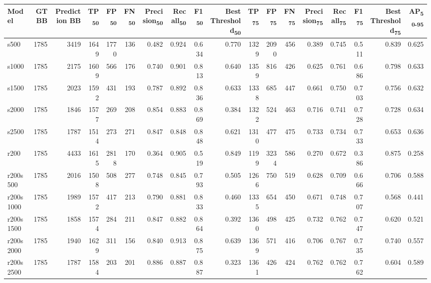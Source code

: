     \begin{table}
    \begin{tabular}{|l|r|r|r|r|r|r|r|r|r|r|r|r|r|r|r|r|r|}
    \hline
    Model & GT BB & Prediction BB & TP\textsubscript{50} & FP\textsubscript{50} & FN\textsubscript{50} & Precision\textsubscript{50} & Recall\textsubscript{50} & F1\textsubscript{50} & Best Threshold\textsubscript{50} & TP\textsubscript{75} & FP\textsubscript{75} & FN\textsubscript{75} & Precision\textsubscript{75} & Recall\textsubscript{75} & F1\textsubscript{75} & Best Threshold\textsubscript{75} & AP\textsubscript{50-95} \\
    \hline
    s500 & 1785 & 3419 & 1649 & 1770 & 136 & 0.482 & 0.924 & 0.634 & 0.770 & 1329 & 2090 & 456 & 0.389 & 0.745 & 0.511 & 0.839 & 0.625 \\
    s1000 & 1785 & 2175 & 1609 & 566 & 176 & 0.740 & 0.901 & 0.813 & 0.640 & 1359 & 816 & 426 & 0.625 & 0.761 & 0.686 & 0.798 & 0.633 \\
    s1500 & 1785 & 2023 & 1592 & 431 & 193 & 0.787 & 0.892 & 0.836 & 0.633 & 1338 & 685 & 447 & 0.661 & 0.750 & 0.703 & 0.756 & 0.632 \\
    s2000 & 1785 & 1846 & 1577 & 269 & 208 & 0.854 & 0.883 & 0.869 & 0.384 & 1322 & 524 & 463 & 0.716 & 0.741 & 0.728 & 0.728 & 0.634 \\
    s2500 & 1785 & 1787 & 1514 & 273 & 271 & 0.847 & 0.848 & 0.848 & 0.621 & 1310 & 477 & 475 & 0.733 & 0.734 & 0.733 & 0.653 & 0.636 \\
    \hline
    r200 & 1785 & 4433 & 1615 & 2818 & 170 & 0.364 & 0.905 & 0.519 & 0.849 & 1199 & 3234 & 586 & 0.270 & 0.672 & 0.386 & 0.875 & 0.258 \\
    r200s500 & 1785 & 2016 & 1508 & 508 & 277 & 0.748 & 0.845 & 0.793 & 0.505 & 1266 & 750 & 519 & 0.628 & 0.709 & 0.666 & 0.706 & 0.588 \\
    r200s1000 & 1785 & 1989 & 1572 & 417 & 213 & 0.790 & 0.881 & 0.833 & 0.460 & 1335 & 654 & 450 & 0.671 & 0.748 & 0.707 & 0.568 & 0.441 \\
    r200s1500 & 1785 & 1858 & 1574 & 284 & 211 & 0.847 & 0.882 & 0.864 & 0.392 & 1360 & 498 & 425 & 0.732 & 0.762 & 0.747 & 0.620 & 0.521 \\
    r200s2000 & 1785 & 1940 & 1629 & 311 & 156 & 0.840 & 0.913 & 0.875 & 0.639 & 1369 & 571 & 416 & 0.706 & 0.767 & 0.735 & 0.740 & 0.557 \\
    r200s2500 & 1785 & 1787 & 1584 & 203 & 201 & 0.886 & 0.887 & 0.887 & 0.323 & 1361 & 426 & 424 & 0.762 & 0.762 & 0.762 & 0.604 & 0.589 \\

\end{tabular}
\end{table}

